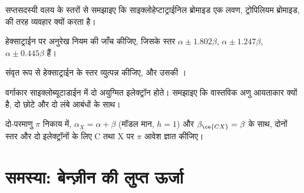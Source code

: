 \begin{exercise}[$\star\star$]\label{exo:b2:huckel:8}
सप्तसदस्यी वलय के स्तरों से समझाइए कि साइक्लोहेप्टाट्राईनिल ब्रोमाइड
एक लवण, ट्रोपिलियम ब्रोमाइड, की तरह व्यवहार क्यों करता है।
\end{exercise}

\begin{exercise}[$\star\star$]\label{exo:b2:huckel:9}
हेक्साट्राईन पर अनुरेख नियम की जाँच कीजिए, जिसके स्तर $\alpha \pm 1.802\beta$, $\alpha \pm
1.247\beta$, $\alpha \pm 0.445\beta$ हैं।
\end{exercise}

\begin{exercise}[$\star\star\star$]\label{exo:b2:huckel:10}
संवृत रूप से हेक्साट्राईन के स्तर व्युत्पन्न कीजिए, और उसकी ।
\end{exercise}

\begin{exercise}[$\star\star\star$]\label{exo:b2:huckel:11}
वर्गाकार साइक्लोब्यूटाडाईन में दो अयुग्मित इलेक्ट्रॉन होते। समझाइए कि वास्तविक अणु
आयताकार क्यों है, दो छोटे और दो लंबे आबंधों के साथ।
\end{exercise}

\begin{exercise}[$\star\star\star$]\label{exo:b2:huckel:12}
दो-परमाणु $\pi$ निकाय  में, $\alpha_X = \alpha + \beta$ (मॉडल मान, $h = 1$) और
$\beta_{\ce{CX}} = \beta$ के साथ, दोनों स्तर और दो इलेक्ट्रॉनों के लिए C तथा X पर $\pi$ आवेश
ज्ञात कीजिए।
\end{exercise}

\section{समस्या: बेन्ज़ीन की लुप्त ऊर्जा}

